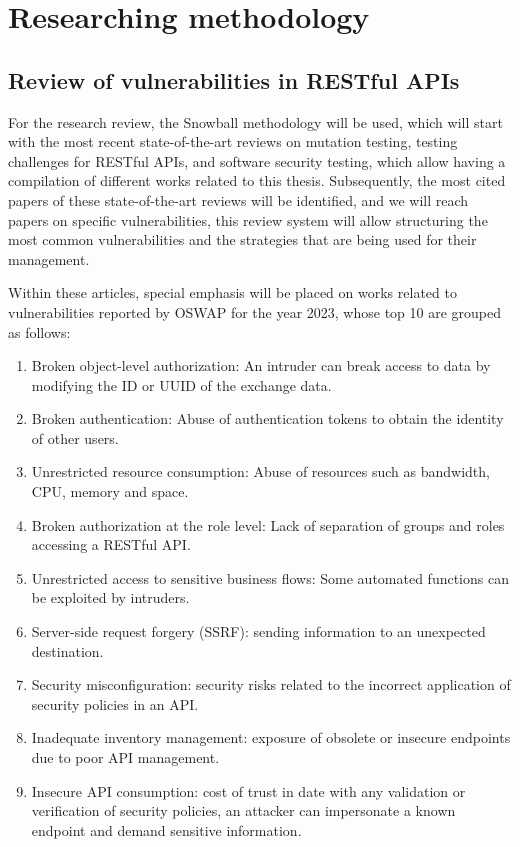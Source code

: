 \section{Researching methodology}

\subsection{ Review of vulnerabilities in RESTful APIs} 

For the research review, the Snowball methodology\cite{Chaim2008}  will be used, which will start with the most recent state-of-the-art reviews on mutation testing\cite{Papadakis2019}, testing challenges for RESTful APIs\cite{Ehsan2022}, and software security testing\cite{Golmohammadi2023}, which allow having a compilation of different works related to this thesis. Subsequently, the most cited papers of these state-of-the-art reviews will be identified, and we will reach papers on specific vulnerabilities, this review system will allow structuring the most common vulnerabilities and the strategies that are being used for their management.

Within these articles, special emphasis will be placed on works related to vulnerabilities reported by OSWAP for the year 2023, whose top 10 are grouped as follows:


\begin{enumerate}
    \item Broken object-level authorization: An intruder can break access to data by modifying the ID or UUID of the exchange data.
    \item Broken authentication: Abuse of authentication tokens to obtain the identity of other users.
    \item Unrestricted resource consumption: Abuse of resources such as bandwidth, CPU, memory and space.
    \item Broken authorization at the role level: Lack of separation of groups and roles accessing a RESTful API.
    \item Unrestricted access to sensitive business flows: Some automated functions can be exploited by intruders.
    \item Server-side request forgery (SSRF): sending information to an unexpected destination.
    \item Security misconfiguration: security risks related to the incorrect application of security policies in an API.
    \item Inadequate inventory management: exposure of obsolete or insecure endpoints due to poor API management.
    \item Insecure API consumption: cost of trust in date with any validation or verification of security policies, an attacker can impersonate a known endpoint and demand sensitive information.
\end{enumerate}

